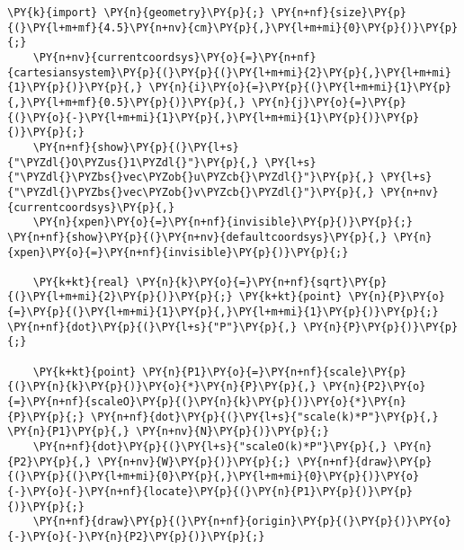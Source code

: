 \begin{Verbatim}[commandchars=\\\{\}]
    \PY{k}{import} \PY{n}{geometry}\PY{p}{;} \PY{n+nf}{size}\PY{p}{(}\PY{l+m+mf}{4.5}\PY{n+nv}{cm}\PY{p}{,}\PY{l+m+mi}{0}\PY{p}{)}\PY{p}{;}
    \PY{n+nv}{currentcoordsys}\PY{o}{=}\PY{n+nf}{cartesiansystem}\PY{p}{(}\PY{p}{(}\PY{l+m+mi}{2}\PY{p}{,}\PY{l+m+mi}{1}\PY{p}{)}\PY{p}{,} \PY{n}{i}\PY{o}{=}\PY{p}{(}\PY{l+m+mi}{1}\PY{p}{,}\PY{l+m+mf}{0.5}\PY{p}{)}\PY{p}{,} \PY{n}{j}\PY{o}{=}\PY{p}{(}\PY{o}{-}\PY{l+m+mi}{1}\PY{p}{,}\PY{l+m+mi}{1}\PY{p}{)}\PY{p}{)}\PY{p}{;}
    \PY{n+nf}{show}\PY{p}{(}\PY{l+s}{"\PYZdl{}O\PYZus{}1\PYZdl{}"}\PY{p}{,} \PY{l+s}{"\PYZdl{}\PYZbs{}vec\PYZob{}u\PYZcb{}\PYZdl{}"}\PY{p}{,} \PY{l+s}{"\PYZdl{}\PYZbs{}vec\PYZob{}v\PYZcb{}\PYZdl{}"}\PY{p}{,} \PY{n+nv}{currentcoordsys}\PY{p}{,}
    \PY{n}{xpen}\PY{o}{=}\PY{n+nf}{invisible}\PY{p}{)}\PY{p}{;} \PY{n+nf}{show}\PY{p}{(}\PY{n+nv}{defaultcoordsys}\PY{p}{,} \PY{n}{xpen}\PY{o}{=}\PY{n+nf}{invisible}\PY{p}{)}\PY{p}{;}

    \PY{k+kt}{real} \PY{n}{k}\PY{o}{=}\PY{n+nf}{sqrt}\PY{p}{(}\PY{l+m+mi}{2}\PY{p}{)}\PY{p}{;} \PY{k+kt}{point} \PY{n}{P}\PY{o}{=}\PY{p}{(}\PY{l+m+mi}{1}\PY{p}{,}\PY{l+m+mi}{1}\PY{p}{)}\PY{p}{;} \PY{n+nf}{dot}\PY{p}{(}\PY{l+s}{"P"}\PY{p}{,} \PY{n}{P}\PY{p}{)}\PY{p}{;}

    \PY{k+kt}{point} \PY{n}{P1}\PY{o}{=}\PY{n+nf}{scale}\PY{p}{(}\PY{n}{k}\PY{p}{)}\PY{o}{*}\PY{n}{P}\PY{p}{,} \PY{n}{P2}\PY{o}{=}\PY{n+nf}{scaleO}\PY{p}{(}\PY{n}{k}\PY{p}{)}\PY{o}{*}\PY{n}{P}\PY{p}{;} \PY{n+nf}{dot}\PY{p}{(}\PY{l+s}{"scale(k)*P"}\PY{p}{,} \PY{n}{P1}\PY{p}{,} \PY{n+nv}{N}\PY{p}{)}\PY{p}{;}
    \PY{n+nf}{dot}\PY{p}{(}\PY{l+s}{"scaleO(k)*P"}\PY{p}{,} \PY{n}{P2}\PY{p}{,} \PY{n+nv}{W}\PY{p}{)}\PY{p}{;} \PY{n+nf}{draw}\PY{p}{(}\PY{p}{(}\PY{l+m+mi}{0}\PY{p}{,}\PY{l+m+mi}{0}\PY{p}{)}\PY{o}{-}\PY{o}{-}\PY{n+nf}{locate}\PY{p}{(}\PY{n}{P1}\PY{p}{)}\PY{p}{)}\PY{p}{;}
    \PY{n+nf}{draw}\PY{p}{(}\PY{n+nf}{origin}\PY{p}{(}\PY{p}{)}\PY{o}{-}\PY{o}{-}\PY{n}{P2}\PY{p}{)}\PY{p}{;}
\end{Verbatim}
